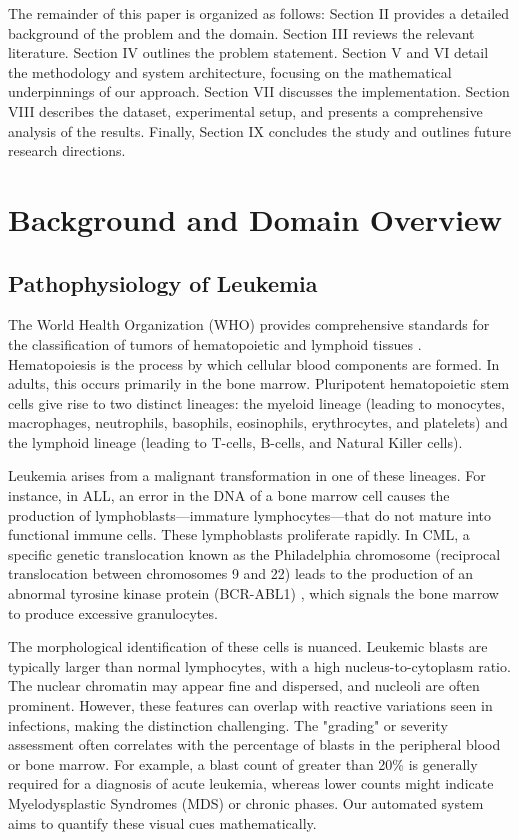 \documentclass[11pt, a4paper]{article}
\begin{document}
The remainder of this paper is organized as follows: Section II provides a detailed background of the problem and the domain. Section III reviews the relevant literature. Section IV outlines the problem statement. Section V and VI detail the methodology and system architecture, focusing on the mathematical underpinnings of our approach. Section VII discusses the implementation. Section VIII describes the dataset, experimental setup, and presents a comprehensive analysis of the results. Finally, Section IX concludes the study and outlines future research directions.

\section{Background and Domain Overview}

\subsection{Pathophysiology of Leukemia}
The World Health Organization (WHO) provides comprehensive standards for the classification of tumors of hematopoietic and lymphoid tissues \cite{r2, r3, r10}. Hematopoiesis is the process by which cellular blood components are formed. In adults, this occurs primarily in the bone marrow. Pluripotent hematopoietic stem cells give rise to two distinct lineages: the myeloid lineage (leading to monocytes, macrophages, neutrophils, basophils, eosinophils, erythrocytes, and platelets) and the lymphoid lineage (leading to T-cells, B-cells, and Natural Killer cells).

Leukemia arises from a malignant transformation in one of these lineages. For instance, in ALL, an error in the DNA of a bone marrow cell causes the production of lymphoblasts—immature lymphocytes—that do not mature into functional immune cells. These lymphoblasts proliferate rapidly. In CML, a specific genetic translocation known as the Philadelphia chromosome (reciprocal translocation between chromosomes 9 and 22) leads to the production of an abnormal tyrosine kinase protein (BCR-ABL1) \cite{r12}, which signals the bone marrow to produce excessive granulocytes.

The morphological identification of these cells is nuanced. Leukemic blasts are typically larger than normal lymphocytes, with a high nucleus-to-cytoplasm ratio. The nuclear chromatin may appear fine and dispersed, and nucleoli are often prominent. However, these features can overlap with reactive variations seen in infections, making the distinction challenging. The "grading" or severity assessment often correlates with the percentage of blasts in the peripheral blood or bone marrow. For example, a blast count of greater than 20\% is generally required for a diagnosis of acute leukemia, whereas lower counts might indicate Myelodysplastic Syndromes (MDS) or chronic phases. Our automated system aims to quantify these visual cues mathematically.
\end{document}
